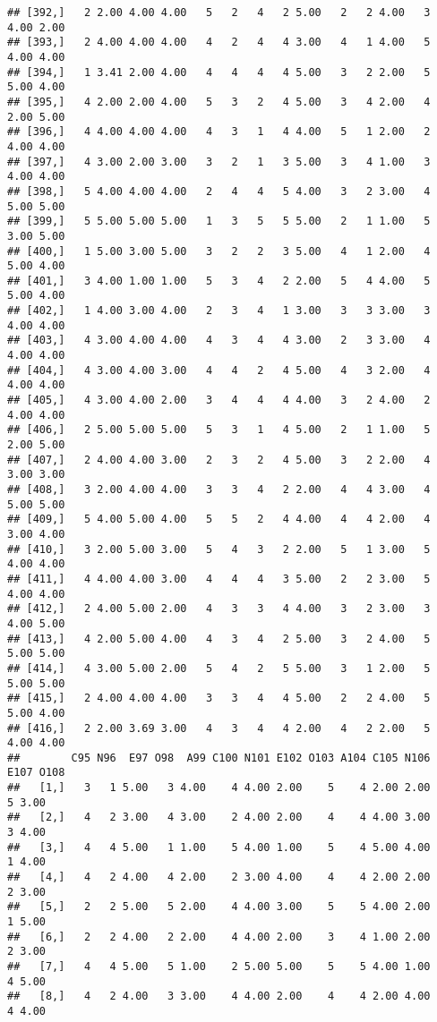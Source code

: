 \documentclass[]{article}
\begin{document}
\begin{verbatim}
## [392,]   2 2.00 4.00 4.00   5   2   4   2 5.00   2   2 4.00   3 4.00 2.00
## [393,]   2 4.00 4.00 4.00   4   2   4   4 3.00   4   1 4.00   5 4.00 4.00
## [394,]   1 3.41 2.00 4.00   4   4   4   4 5.00   3   2 2.00   5 5.00 4.00
## [395,]   4 2.00 2.00 4.00   5   3   2   4 5.00   3   4 2.00   4 2.00 5.00
## [396,]   4 4.00 4.00 4.00   4   3   1   4 4.00   5   1 2.00   2 4.00 4.00
## [397,]   4 3.00 2.00 3.00   3   2   1   3 5.00   3   4 1.00   3 4.00 4.00
## [398,]   5 4.00 4.00 4.00   2   4   4   5 4.00   3   2 3.00   4 5.00 5.00
## [399,]   5 5.00 5.00 5.00   1   3   5   5 5.00   2   1 1.00   5 3.00 5.00
## [400,]   1 5.00 3.00 5.00   3   2   2   3 5.00   4   1 2.00   4 5.00 4.00
## [401,]   3 4.00 1.00 1.00   5   3   4   2 2.00   5   4 4.00   5 5.00 4.00
## [402,]   1 4.00 3.00 4.00   2   3   4   1 3.00   3   3 3.00   3 4.00 4.00
## [403,]   4 3.00 4.00 4.00   4   3   4   4 3.00   2   3 3.00   4 4.00 4.00
## [404,]   4 3.00 4.00 3.00   4   4   2   4 5.00   4   3 2.00   4 4.00 4.00
## [405,]   4 3.00 4.00 2.00   3   4   4   4 4.00   3   2 4.00   2 4.00 4.00
## [406,]   2 5.00 5.00 5.00   5   3   1   4 5.00   2   1 1.00   5 2.00 5.00
## [407,]   2 4.00 4.00 3.00   2   3   2   4 5.00   3   2 2.00   4 3.00 3.00
## [408,]   3 2.00 4.00 4.00   3   3   4   2 2.00   4   4 3.00   4 5.00 5.00
## [409,]   5 4.00 5.00 4.00   5   5   2   4 4.00   4   4 2.00   4 3.00 4.00
## [410,]   3 2.00 5.00 3.00   5   4   3   2 2.00   5   1 3.00   5 4.00 4.00
## [411,]   4 4.00 4.00 3.00   4   4   4   3 5.00   2   2 3.00   5 4.00 4.00
## [412,]   2 4.00 5.00 2.00   4   3   3   4 4.00   3   2 3.00   3 4.00 5.00
## [413,]   4 2.00 5.00 4.00   4   3   4   2 5.00   3   2 4.00   5 5.00 5.00
## [414,]   4 3.00 5.00 2.00   5   4   2   5 5.00   3   1 2.00   5 5.00 5.00
## [415,]   2 4.00 4.00 4.00   3   3   4   4 5.00   2   2 4.00   5 5.00 4.00
## [416,]   2 2.00 3.69 3.00   4   3   4   4 2.00   4   2 2.00   5 4.00 4.00
##        C95 N96  E97 O98  A99 C100 N101 E102 O103 A104 C105 N106 E107 O108
##   [1,]   3   1 5.00   3 4.00    4 4.00 2.00    5    4 2.00 2.00    5 3.00
##   [2,]   4   2 3.00   4 3.00    2 4.00 2.00    4    4 4.00 3.00    3 4.00
##   [3,]   4   4 5.00   1 1.00    5 4.00 1.00    5    4 5.00 4.00    1 4.00
##   [4,]   4   2 4.00   4 2.00    2 3.00 4.00    4    4 2.00 2.00    2 3.00
##   [5,]   2   2 5.00   5 2.00    4 4.00 3.00    5    5 4.00 2.00    1 5.00
##   [6,]   2   2 4.00   2 2.00    4 4.00 2.00    3    4 1.00 2.00    2 3.00
##   [7,]   4   4 5.00   5 1.00    2 5.00 5.00    5    5 4.00 1.00    4 5.00
##   [8,]   4   2 4.00   3 3.00    4 4.00 2.00    4    4 2.00 4.00    4 4.00

\end{verbatim}
\end{document}

